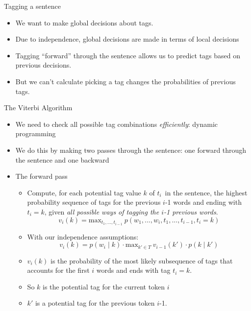 \documentclass[11pt,letterpaper]{article}
\newcommand{\tcurr}{\ensuremath{t_i}}
\begin{document}
Tagging a sentence

\begin{itemize}
  \item We want to make global decisions about tags.
  \item Due to independence, global decisions are made in terms of local decisions
  \item Tagging ``forward'' through the sentence allows us to predict tags based on previous decisions.
  \item But we can't calculate picking a tag changes the probabilities of previous tags.
\end{itemize}

The Viterbi Algorithm

\begin{itemize}
  \item We need to check all possible tag combinations \textit{efficiently}: dynamic programming
  \item We do this by making two passes through the sentence: one forward through the sentence and one backward
  \item The forward pass
    \begin{itemize}
      \item Compute, for each potential tag value $k$ of \tcurr\ in the sentence, the highest probability sequence of tags for the previous $i$-1 words and ending with $t_i=k$, given \textit{all possible ways of tagging the $i$-1 previous words}.
        \[
          v_i(k) = \text{max}_{t_1, ..., t_{i-1}}~p(w_1, ..., w_i, t_1, ..., t_{i-1}, t_i=k)
        \]
      \item With our independence assumptions:
        \[
          v_i(k) = p(w_i \mid k) \cdot \text{max}_{k' \in T}~v_{i-1}(k') \cdot p(k \mid k')
        \]
      \item $v_i(k)$ is the probability of the most likely subsequence of tags that accounts for the first $i$ words and ends with tag $t_i = k$.
      \item So $k$ is the potential tag for the current token $i$
      \item $k'$ is a potential tag for the previous token $i$-1.

\end{itemize}
\end{itemize}
\end{document}
